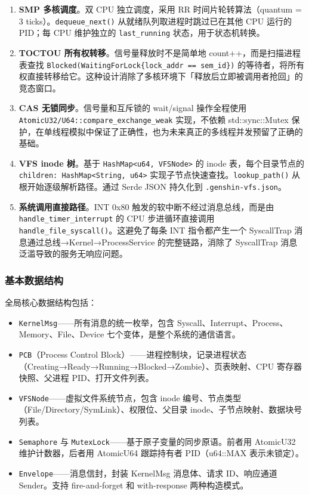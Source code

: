 \documentclass[UTF8,a4paper,12pt]{ctexart}
\begin{document}
\begin{enumerate}[label=(\arabic*)]
    \item \textbf{SMP 多核调度}。双 CPU 独立调度，采用 RR 时间片轮转算法（quantum = 3 ticks）。\texttt{dequeue\_next()} 从就绪队列取进程时跳过已在其他 CPU 运行的 PID；每 CPU 维护独立的 \texttt{last\_running} 状态，用于状态机转换。
    \item \textbf{TOCTOU 所有权转移}。信号量释放时不是简单地 count++，而是扫描进程表查找 \texttt{Blocked(WaitingForLock\{lock\_addr == sem\_id\})} 的等待者，将所有权直接转移给它。这种设计消除了多核环境下「释放后立即被调用者抢回」的竞态窗口。
    \item \textbf{CAS 无锁同步}。信号量和互斥锁的 wait/signal 操作全程使用 \texttt{AtomicU32/U64::compare\_exchange\_weak} 实现，不依赖 std::sync::Mutex 保护，在单线程模拟中保证了正确性，也为未来真正的多线程并发预留了正确的基础。
    \item \textbf{VFS inode 树}。基于 \texttt{HashMap<u64, VFSNode>} 的 inode 表，每个目录节点的 \texttt{children: HashMap<String, u64>} 实现子节点快速查找。\texttt{lookup\_path()} 从根开始逐级解析路径。通过 Serde JSON 持久化到 \texttt{.genshin-vfs.json}。
    \item \textbf{系统调用直接路径}。INT 0x80 触发的软中断不经过消息总线，而是由 \texttt{handle\_timer\_interrupt} 的 CPU 步进循环直接调用 \texttt{handle\_file\_syscall()}。这避免了每条 INT 指令都产生一个 SyscallTrap 消息通过总线→Kernel→ProcessService 的完整链路，消除了 SyscallTrap 消息泛滥导致的服务无响应问题。
\end{enumerate}

\subsubsection{基本数据结构}

全局核心数据结构包括：

\begin{itemize}
    \item \texttt{KernelMsg}——所有消息的统一枚举，包含 Syscall、Interrupt、Process、Memory、File、Device 七个变体，是整个系统的通信语言。
    \item \texttt{PCB}（Process Control Block）——进程控制块，记录进程状态（Creating→Ready→Running→Blocked→Zombie）、页表映射、CPU 寄存器快照、父进程 PID、打开文件列表。
    \item \texttt{VFSNode}——虚拟文件系统节点，包含 inode 编号、节点类型（File/Directory/SymLink）、权限位、父目录 inode、子节点映射、数据块号列表。
    \item \texttt{Semaphore} 与 \texttt{MutexLock}——基于原子变量的同步原语。前者用 AtomicU32 维护计数器，后者用 AtomicU64 跟踪持有者 PID（u64::MAX 表示未锁定）。
    \item \texttt{Envelope}——消息信封，封装 KernelMsg 消息体、请求 ID、响应通道 Sender。支持 fire-and-forget 和 with-response 两种构造模式。
\end{itemize}
\end{document}
